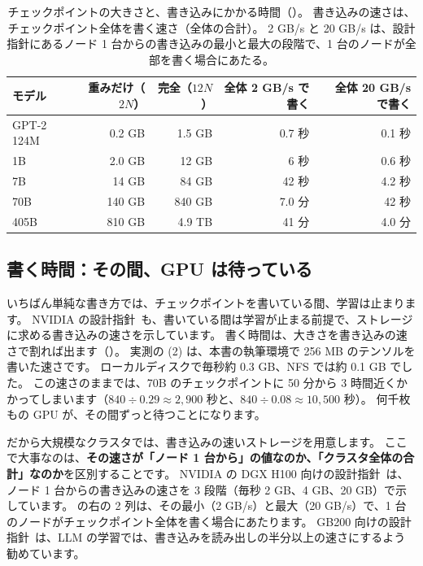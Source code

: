 \begin{table}[tbp]
\centering
\caption{チェックポイントの大きさと、書き込みにかかる時間（）。
書き込みの速さは、チェックポイント全体を書く速さ（全体の合計）。
2 GB/s と 20 GB/s は、設計指針にあるノード 1 台からの書き込みの最小と最大の段階で、1 台のノードが全部を書く場合にあたる。}
\label{tab:infra-ckpt}
\footnotesize
\begin{tabular}{lrrrr}
\toprule
モデル & 重みだけ（$2N$） & 完全（$12N$） & 全体 2 GB/s で書く & 全体 20 GB/s で書く \\
\midrule
GPT-2 124M & 0.2 GB & 1.5 GB & 0.7 秒 & 0.1 秒 \\
1B & 2.0 GB & 12 GB & 6 秒 & 0.6 秒 \\
7B & 14 GB & 84 GB & 42 秒 & 4.2 秒 \\
70B & 140 GB & 840 GB & 7.0 分 & 42 秒 \\
405B & 810 GB & 4.9 TB & 41 分 & 4.0 分 \\
\bottomrule
\end{tabular}
\end{table}

\subsection*{書く時間：その間、GPU は待っている}

いちばん単純な書き方では、チェックポイントを書いている間、学習は止まります。
NVIDIA の設計指針~\cite{nvidia2023superpod}も、書いている間は学習が止まる前提で、ストレージに求める書き込みの速さを示しています。
書く時間は、大きさを書き込みの速さで割れば出ます（）。
実測の (2) は、本書の執筆環境で 256 MB のテンソルを書いた速さです。
ローカルディスクで毎秒約 0.3 GB、NFS では約 0.1 GB でした。
この速さのままでは、70B のチェックポイントに 50 分から 3 時間近くかかってしまいます（$840\div0.29\approx2{,}900$ 秒と、$840\div0.08\approx10{,}500$ 秒）。
何千枚もの GPU が、その間ずっと待つことになります。

だから大規模なクラスタでは、書き込みの速いストレージを用意します。
ここで大事なのは、\textbf{その速さが「ノード 1 台から」の値なのか、「クラスタ全体の合計」なのか}を区別することです。
NVIDIA の DGX H100 向けの設計指針~\cite{nvidia2023superpod}は、ノード 1 台からの書き込みの速さを 3 段階（毎秒 2 GB、4 GB、20 GB）で示しています。
の右の 2 列は、その最小（2 GB/s）と最大（20 GB/s）で、1 台のノードがチェックポイント全体を書く場合にあたります。
GB200 向けの設計指針~\cite{nvidia2025superpod}は、LLM の学習では、書き込みを読み出しの半分以上の速さにするよう勧めています。

